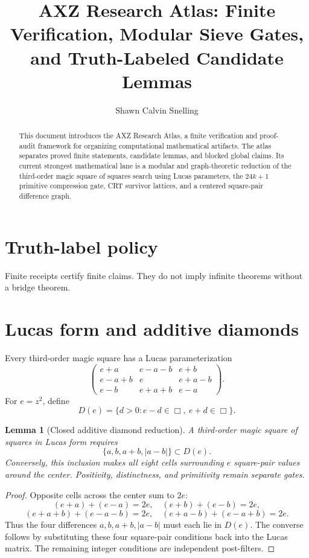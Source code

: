 \documentclass{amsart}
\title[AXZ Research Atlas]{AXZ Research Atlas: Finite Verification, Modular Sieve Gates, and Truth-Labeled Candidate Lemmas}
\author{Shawn Calvin Snelling}
\newtheorem{lemma}[theorem]{Lemma}
\theoremstyle{definition}
\begin{document}
\begin{abstract}
This document introduces the AXZ Research Atlas, a finite verification and proof-audit framework for organizing computational mathematical artifacts. The atlas separates proved finite statements, candidate lemmas, and blocked global claims. Its current strongest mathematical lane is a modular and graph-theoretic reduction of the third-order magic square of squares search using Lucas parameters, the \(24k+1\) primitive compression gate, CRT survivor lattices, and a centered square-pair difference graph.
\end{abstract}
\maketitle

\section{Truth-label policy}
Finite receipts certify finite claims. They do not imply infinite theorems without a bridge theorem.

\section{Lucas form and additive diamonds}
Every third-order magic square has a Lucas parameterization
\[
\begin{pmatrix}
e+a & e-a-b & e+b\\
e-a+b & e & e+a-b\\
e-b & e+a+b & e-a
\end{pmatrix}.
\]
For \(e=z^2\), define
\[
D(e)=\{d>0:e-d\in\Box,\ e+d\in\Box\}.
\]

\begin{lemma}[Closed additive diamond reduction]
A third-order magic square of squares in Lucas form requires
\[
\{a,b,a+b,|a-b|\}\subset D(e).
\]
Conversely, this inclusion makes all eight cells surrounding \(e\) square-pair values around the center. Positivity, distinctness, and primitivity remain separate gates.
\end{lemma}

\begin{proof}
Opposite cells across the center sum to \(2e\):
\[
(e+a)+(e-a)=2e,\quad (e+b)+(e-b)=2e,
\]
\[
(e+a+b)+(e-a-b)=2e,\quad (e+a-b)+(e-a+b)=2e.
\]
Thus the four differences \(a,b,a+b,|a-b|\) must each lie in \(D(e)\). The converse follows by substituting these four square-pair conditions back into the Lucas matrix. The remaining integer conditions are independent post-filters.
\end{proof}
\end{document}
